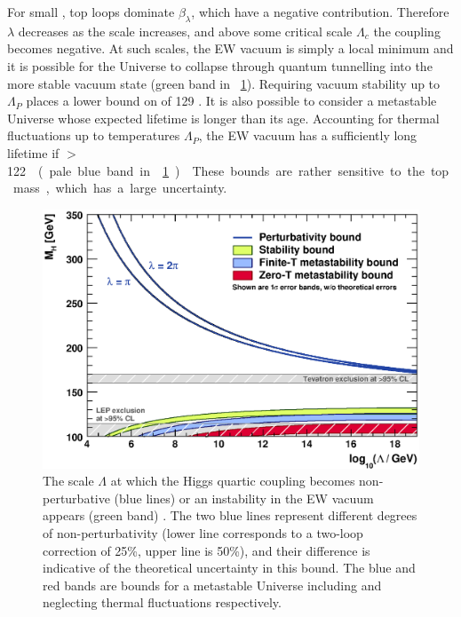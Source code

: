 For small \mH, top loops dominate $\beta_{\lambda}$, which have a negative 
contribution. Therefore $\lambda$ decreases as the scale increases, and above some 
critical scale $\Lambda_c$ the coupling becomes negative. At such scales, the \ac{EW} 
vacuum is simply a local minimum and it is possible for the Universe to collapse through
quantum tunnelling into the more stable vacuum state (green band in 
\Figure~\ref{fig:theory_constraints}). Requiring vacuum stability up to $\Lambda_{P}$ 
places a lower bound on \mH of \unit{129}{\GeV} \cite{Ellis:2009}. It is also possible 
to consider a metastable Universe whose expected lifetime is longer than its age.
Accounting for thermal fluctuations up to temperatures \about $\Lambda_{P}$, the \ac{EW}
vacuum has a sufficiently long lifetime if \unit{\mH$>$122}{\GeV} (pale blue band in 
\Figure~\ref{fig:theory_constraints}) \cite{Ellis:2009}. These bounds are rather 
sensitive to the top mass, which has a large uncertainty.

\begin{figure}
	\includegraphics[width=\mediumfigwidth]{tex/motivation/theory_constraints}
	\caption{The scale $\Lambda$ at which the Higgs quartic coupling becomes 
	non-perturbative (blue lines) or an instability in the \ac{EW} vacuum appears
	(green band) \cite{Ellis:2009}. The two blue lines represent different degrees of 
	non-perturbativity (lower line corresponds to a two-loop correction of 25\%, upper 
	line is 50\%), and their difference is indicative of the theoretical uncertainty in 
	this bound. The blue and red bands are bounds for a metastable Universe including and
	neglecting thermal fluctuations respectively.}
	\label{fig:theory_constraints}
\end{figure}



